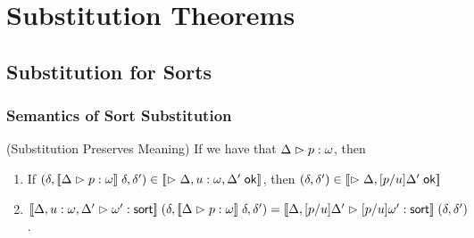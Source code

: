 \section{Substitution Theorems}

\subsection{Substitution for Sorts}

\subsubsection{Semantics of Sort Substitution}

\begin{lemma}{(Substitution Preserves Meaning)}
If we have that $\judgeA{p}{\omega}$, then 

\begin{enumerate}
\item If $(\delta, \interp{\judgeA{p}{\omega}}\;\delta, \delta') \in \interp{\judgeACtx{\Delta, u:\omega, \Delta'}}$, 
      then $(\delta, \delta') \in \interp{\judgeACtx{\Delta, [p/u]\Delta'}}$

\item  $\interp{\judgeSort[{\Delta, u:\omega, \Delta'}]{\omega'}}\;(\delta, \interp{\judgeA{p}{\omega}}\;\delta, \delta') = \interp{\judgeSort[{\Delta, [p/u]\Delta'}]{[p/u]\omega'}}\;(\delta, \delta')$. 
\end{enumerate}
\end{lemma}

